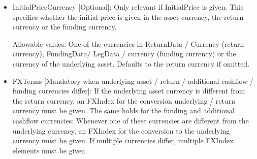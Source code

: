 \begin{itemize}
\begin{itemize}
\begin{itemize}
\begin{itemize}
        Note that Korean bonds typically use Currency per Unit quotation method, whereas other bonds typically use Percentage of Par.
      \end{itemize}
      \item the weighted price of one unit of the bond underlying basket, notice that this is always a ``percentage of
        par'' price regardless of the quotation style of the single bonds in the basket
      \item the (weighted) price of (one unit of) the equity underlying (basket)
      \item the (weighted) price of (one unit of) the equity option underlying (basket)
      \item an {\em absolute amount in the initial price ccy (``dollar amount'')} if more than one underlying is
        specified and if a derivative is specified
      \item absolute NPV if underlying is a CBO
    \end{itemize}
    Notice that for an equity basket underlying with several currencies involved, the initial price is assumed to be given in the
    return currency in case no InitialPriceCurrency is given.

    Allowable values: A real number. If omitted or left blank it defaults to the equity (or bond) price of the valuation
    date associated with the start date. When this valuation date is in the future there is no fixed price, 
    and in these cases the InitialPrice defaults to the forward price.
    
  \item InitialPriceCurrency [Optional]: Only relevant if InitialPrice is given. This specifies whether the initial
    price is given in the asset currency, the return currency or the funding currency.
    
    Allowable values: One of the currencies in ReturnData / Currency (return currency), FundingData/ LegData / currency
    (funding currency) or the currency of the underlying asset. Defaults to the return currency if omitted.

  \item FXTerms [Mandatory when underlying asset / return / additional cashflow / funding currencies differ]: If the
    underlying asset currency is different from the return currency, an FXIndex for the conversion underlying / return currency
    must be given. The same holds for the funding and additional cashflow currencies: Whenever one of these currencies
    are different from the underlying currency, an FXIndex for the conversion to the underlying currency must be given. If multiple currencies differ, 
    multiple FXIndex elements must be given.


\end{itemize}
\end{itemize}
